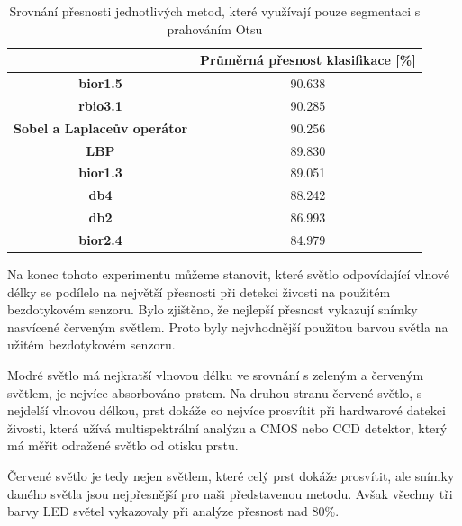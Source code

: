 \capstartfalse
\begin{table}[!htbp]
\centering
\begin{tabular}{|c|c|}
\hline
                                    & \textbf{Průměrná přesnost klasifikace {[}\%{]}} \\ \hline
\textbf{bior1.5}                        & 90.638                                         \\ \hline
\textbf{rbio3.1}                    & 90.285                                         \\ \hline
\textbf{Sobel a Laplaceův operátor}                    & 90.256                                         \\ \hline
\textbf{LBP} & 89.830                                         \\ \hline
\textbf{bior1.3}                    & 89.051                                         \\ \hline
\textbf{db4}                        & 88.242                                        \\ \hline
\textbf{db2}                        & 86.993                                         \\ \hline
\textbf{bior2.4}                    & 84.979                                         \\ \hline
\end{tabular}
\caption{Srovnání přesnosti jednotlivých metod, které využívají pouze segmentaci s prahováním Otsu}
\end{table}
\capstarttrue

Na konec tohoto experimentu můžeme stanovit, které světlo odpovídající vlnové délky se podílelo na největší přesnosti při detekci živosti na použitém bezdotykovém senzoru. Bylo zjištěno, že nejlepší přesnost vykazují snímky nasvícené červeným světlem. Proto byly nejvhodnější použitou barvou světla na užitém bezdotykovém senzoru. 

Modré světlo má nejkratší vlnovou délku ve srovnání s zeleným a červeným světlem, je nejvíce absorbováno prstem. Na druhou stranu červené světlo, s nejdelší vlnovou délkou, prst dokáže co nejvíce prosvítit při hardwarové datekci živosti, která užívá multispektrální analýzu a CMOS nebo CCD detektor, který má měřit odražené světlo od otisku prstu. \cite{AdvancedBiometricsTechnologies2011}

Červené světlo je tedy nejen světlem, které celý prst dokáže prosvítit, ale snímky daného světla jsou nejpřesnější pro naši představenou metodu. Avšak všechny tři barvy LED světel vykazovaly při analýze přesnost nad 80\%.

